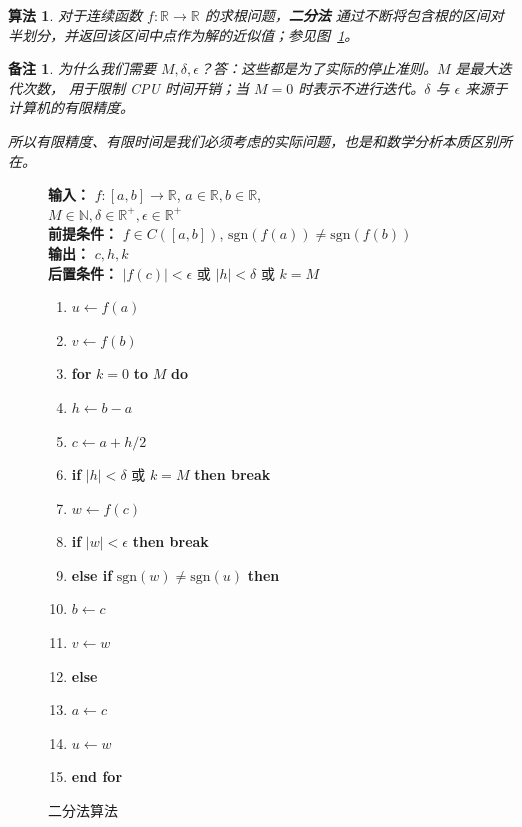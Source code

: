 \documentclass[a4paper]{ctexart}
\newtheorem{remark}{备注}
\newtheorem{algorithm}[theorem]{算法}
\numberwithin{theorem}{section}
\numberwithin{equation}{section}
\numberwithin{figure}{section}
\numberwithin{remark}{section}
\begin{document}
\begin{algorithm}
    \label{alg::bisection}
对于连续函数 $f : \mathbb{R} \to \mathbb{R}$ 的求根问题，\textbf{二分法} 通过不断将包含根的区间对半划分，并返回该区间中点作为解的近似值；参见图~\ref{fig::bisection}。
\end{algorithm}


\begin{remark}
为什么我们需要 $M, \delta, \epsilon$？答：这些都是为了实际的停止准则。$M$ 是最大迭代次数，
用于限制 CPU 时间开销；当 $M = 0$ 时表示不进行迭代。$\delta$ 与 $\epsilon$ 来源于计算机的有限精度。    

所以有限精度、有限时间是我们必须考虑的实际问题，也是和数学分析本质区别所在。
\end{remark}

\begin{figure}
\centering
\begin{minipage}{0.75\textwidth}
\textbf{输入：} $f : [a,b] \rightarrow \mathbb{R}$, $a \in \mathbb{R}, b \in \mathbb{R}$, \\
$M \in \mathbb{N}, \delta \in \mathbb{R}^+, \epsilon \in \mathbb{R}^+$ \\
\textbf{前提条件：} $f \in C([a,b])$, $\text{sgn}(f(a)) \neq \text{sgn}(f(b))$ \\
\textbf{输出：} $c, h, k$ \\
\textbf{后置条件：} $|f(c)| < \epsilon$ 或 $|h| < \delta$ 或 $k = M$

\begin{enumerate}
\item $u \leftarrow f(a)$
\item $v \leftarrow f(b)$
\item \textbf{for} $k = 0$ \textbf{to} $M$ \textbf{do}
\item \quad $h \leftarrow b - a$
\item \quad $c \leftarrow a + h/2$
\item \quad \textbf{if} $|h| < \delta$ 或 $k = M$ \textbf{then break}
\item \quad $w \leftarrow f(c)$
\item \quad \textbf{if} $|w| < \epsilon$ \textbf{then break}
\item \quad \textbf{else if} $\text{sgn}(w) \neq \text{sgn}(u)$ \textbf{then}
\item \qquad $b \leftarrow c$
\item \qquad $v \leftarrow w$
\item \quad \textbf{else}
\item \qquad $a \leftarrow c$
\item \qquad $u \leftarrow w$
\item \textbf{end for}
\end{enumerate}
\caption{二分法算法}
\label{fig::bisection}
\end{minipage}
\end{figure}
\end{document}

